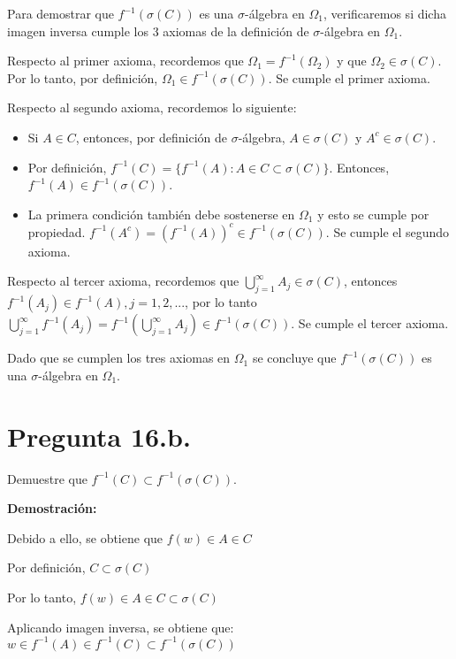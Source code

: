 \documentclass[11pt]{article}
\begin{document}
Para demostrar que $\mathit{f}^{-1}(\sigma(C))$ es una $\sigma$-álgebra en $\Omega_{1}$, verificaremos si dicha imagen inversa cumple los 3 axiomas de la definición de $\sigma$-álgebra en $\Omega_{1}$. 

Respecto al primer axioma, recordemos que $\Omega_{1} = \mathit{f}^{-1}(\Omega_{2})$ y que $\Omega_{2} \in \sigma(C)$. Por lo tanto, por definición, $\Omega_{1} \in \mathit{f}^{-1}(\sigma(C))$. Se cumple el primer axioma.

Respecto al segundo axioma, recordemos lo siguiente:
\begin{itemize}
	\item Si $ A \in C$, entonces, por definición de $\sigma$-álgebra, $\mathit{A} \in \sigma(C)$ y $\mathit{A}^{c} \in \sigma(C)$.
	\item Por definición, $\mathit{f}^{-1} (C) = \{\mathit{f}^{-1} (A): A \in C \subset \sigma(C) \}$. Entonces, $\mathit{f}^{-1}(A) \in \mathit{f}^{-1}(\sigma(C))$.
	\item La primera condición también debe sostenerse en $\Omega_{1}$ y esto se cumple por propiedad. $\mathit{f}^{-1}(A^{c}) = (\mathit{f}^{-1}(A))^{c} \in \mathit{f}^{-1}(\sigma(C))$. Se cumple el segundo axioma.
\end{itemize}

Respecto al tercer axioma, recordemos que $\bigcup^{\infty}_{j=1} A_{j} \in \sigma(C)$, entonces $\mathit{f}^{-1}(A_{j}) \in \mathit{f}^{-1}(A), j=1,2, ... $, por lo tanto  $\bigcup_{j=1}^{\infty} \mathit{f}^{-1}(A_j) = \mathit{f}^{-1}(\bigcup_{j=1}^{\infty}A_j) \in \mathit{f}^{-1}(\sigma(C))$. Se cumple el tercer axioma.

Dado que se cumplen los tres axiomas en $\Omega_{1}$ se concluye que $\mathit{f}^{-1} (\sigma(C))$ es una $\sigma$-álgebra en $\Omega_{1}$.

\section{Pregunta 16.b.}

Demuestre que $\mathit{f}^{-1} (C) \subset \mathit{f}^{-1} (\sigma(C))$.

\textbf{Demostración:}

Debido a ello, se obtiene que $\mathit{f}(w) \in A \in C$

Por definición, $C \subset \sigma(C)$

Por lo tanto, $\mathit{f}(w) \in A \in C \subset \sigma(C)$

Aplicando imagen inversa, se obtiene que: $w \in \mathit{f}^{-1} (A) \in \mathit{f}^{-1} (C) \subset \mathit{f}^{-1} (\sigma(C))$
\end{document}
